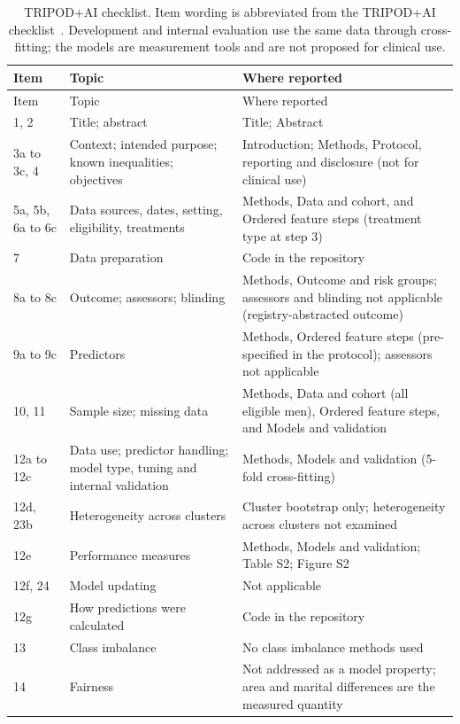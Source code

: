 \documentclass[10pt,a4paper]{article}
\begin{document}
{\footnotesize
\begin{longtable}{@{}>{\raggedright}p{2.3cm}>{\raggedright}p{5.0cm}>{\raggedright\arraybackslash}p{7.8cm}@{}}
\caption{TRIPOD+AI checklist. Item wording is abbreviated from the TRIPOD+AI checklist~\cite{tripodai2024}. Development and internal evaluation use the same data through cross-fitting; the models are measurement tools and are not proposed for clinical use.}\label{tab:tripod}\\
\toprule
\rowcolor{tablehead}Item & Topic & Where reported \\
\midrule
\endfirsthead
\toprule
\rowcolor{tablehead}Item & Topic & Where reported \\
\midrule
\endhead
1, 2 & Title; abstract & Title; Abstract \\
3a to 3c, 4 & Context; intended purpose; known inequalities; objectives & Introduction; Methods, Protocol, reporting and disclosure (not for clinical use) \\
5a, 5b, 6a to 6c & Data sources, dates, setting, eligibility, treatments & Methods, Data and cohort, and Ordered feature steps (treatment type at step 3) \\
7 & Data preparation & Code in the repository \\
8a to 8c & Outcome; assessors; blinding & Methods, Outcome and risk groups; assessors and blinding not applicable (registry-abstracted outcome) \\
9a to 9c & Predictors & Methods, Ordered feature steps (pre-specified in the protocol); assessors not applicable \\
10, 11 & Sample size; missing data & Methods, Data and cohort (all eligible men), Ordered feature steps, and Models and validation \\
12a to 12c & Data use; predictor handling; model type, tuning and internal validation & Methods, Models and validation (5-fold cross-fitting) \\
12d, 23b & Heterogeneity across clusters & Cluster bootstrap only; heterogeneity across clusters not examined \\
12e & Performance measures & Methods, Models and validation; Table S2; Figure S2 \\
12f, 24 & Model updating & Not applicable \\
12g & How predictions were calculated & Code in the repository \\
13 & Class imbalance & No class imbalance methods used \\
14 & Fairness & Not addressed as a model property; area and marital differences are the measured quantity \\

\end{longtable}}
\end{document}
